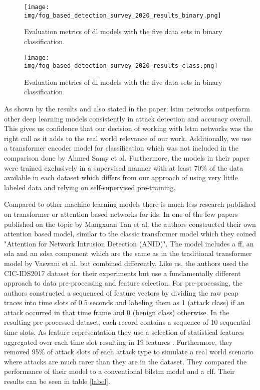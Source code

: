 \begin{figure}[h]
	\centering
	\texttt{[image: img/fog\_based\_detection\_survey\_2020\_results\_binary.png]}
	\caption{Evaluation metrics of \gls{dl} models with the five data sets in binary classification. \cite{fog_based_detection_survey_2020}}
	\label{fig:stateofart:fog_based_detection_survey_2020_results_binary}
\end{figure}

\begin{figure}[h]
	\centering
	\texttt{[image: img/fog\_based\_detection\_survey\_2020\_results\_class.png]}
	\caption{Evaluation metrics of \gls{dl} models with the five data sets in binary classification. \cite{fog_based_detection_survey_2020}}
	\label{fig:stateofart:fog_based_detection_survey_2020_results_class}
\end{figure}

As shown by the results and also stated in the paper: \gls{lstm} networks outperform other deep learning models consistently in attack detection and accuracy overall. This gives us confidence that our decision of working with \gls{lstm} networks was the right call as it adds to the real world relevance of our work. Additionally, we use a transformer encoder model for classification which was not included in the comparison done by Ahmed Samy et al. Furthermore, the models in their paper were trained exclusively in a supervised manner with at least 70\% of the data available in each dataset which differs from our approach of using very little labeled data and relying on self-supervised pre-training. \par

Compared to other machine learning models there is much less research published on transformer or attention based networks for \gls{ids}. In one of the few papers published on the topic by Mangxuan Tan et al. the authors constructed their own attention based model, similar to the classic transformer model \cite{attention_model_ids} which they coined "Attention for Network Intrusion Detection (ANID)". The model includes a \gls{ff}, an \gls{sda} and an \gls{sdsa} component which are the same as in the traditional transformer model by Vaswani et al. but combined differently. Like us, the authors used the CIC-IDS2017 dataset for their experiments but use a fundamentally different approach to data pre-processing and feature selection. For pre-processing, the authors constructed a sequenced of feature vectors by dividing the raw pcap traces into time slots of 0.5 seconds and labeling them as 1 (attack class) if an attack occurred in that time frame and 0 (benign class) otherwise. In the resulting pre-processed dataset, each record contains a sequence of 10 sequential time slots. As feature representation they use a selection of statistical features aggregated over each time slot resulting in 19 features \cite{attention_model_ids}. Furthermore, they removed 95\% of attack slots of each attack type to simulate a real world scenario where attacks are much rarer than they are in the dataset. They compared the performance of their model to a conventional \gls{bilstm} model and a \gls{clf}. Their results can be seen in table \ref{label}.

